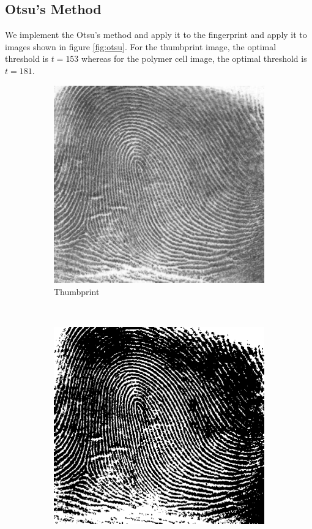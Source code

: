 \documentclass[]{article}
\begin{document}
\subsection{Otsu's Method}
We implement the Otsu's method and apply it to the fingerprint and apply it to images shown in figure \ref{fig:otsu}. For the thumbprint image, the optimal threshold is $t=153$ whereas for the polymer cell image, the optimal threshold is $t=181$.
\begin{figure}[H]
    \centering
    \begin{subfigure}{0.25\textwidth}
        \centering
        \includegraphics[width=\textwidth]{img/before/thumbprint}
        \caption{Thumbprint}
    \end{subfigure}%
    ~
    \begin{subfigure}{0.25\textwidth}
        \centering
        \includegraphics[width=\textwidth]{img/thumbprint-segmented}

\end{subfigure}
\end{figure}
\end{document}
